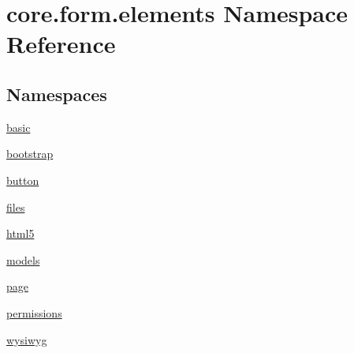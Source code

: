 \hypertarget{namespacecore_1_1form_1_1elements}{\section{core.\-form.\-elements Namespace Reference}
\label{namespacecore_1_1form_1_1elements}
}
\subsection*{Namespaces}
\begin{DoxyCompactItemize}
\item 
\hyperlink{namespacecore_1_1form_1_1elements_1_1basic}{basic}
\item 
\hyperlink{namespacecore_1_1form_1_1elements_1_1bootstrap}{bootstrap}
\item 
\hyperlink{namespacecore_1_1form_1_1elements_1_1button}{button}
\item 
\hyperlink{namespacecore_1_1form_1_1elements_1_1files}{files}
\item 
\hyperlink{namespacecore_1_1form_1_1elements_1_1html5}{html5}
\item 
\hyperlink{namespacecore_1_1form_1_1elements_1_1models}{models}
\item 
\hyperlink{namespacecore_1_1form_1_1elements_1_1page}{page}
\item 
\hyperlink{namespacecore_1_1form_1_1elements_1_1permissions}{permissions}
\item 
\hyperlink{namespacecore_1_1form_1_1elements_1_1wysiwyg}{wysiwyg}
\end{DoxyCompactItemize}
